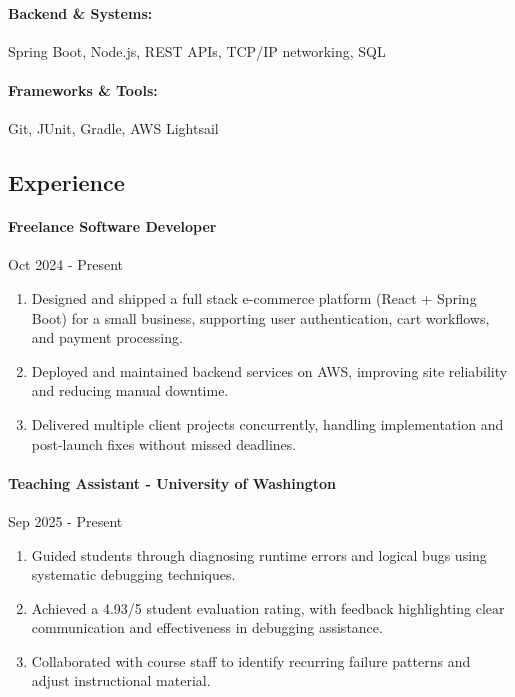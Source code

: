 \documentclass{article}
\begin{document}
\paragraph{Backend \& Systems:} Spring Boot, Node.js, REST APIs, TCP/IP networking, SQL
\vspace{-0.75em}
\paragraph{Frameworks \& Tools:} Git, JUnit, Gradle, AWS Lightsail
\vspace{-0.75em}

\subsection*{Experience}\vspace{-0.75em}\hrulefill\vspace{-1em}

\paragraph{Freelance Software Developer} \hfill Oct 2024 - Present
\begin{enumerate}[label=$\bullet$]
    \item Designed and shipped a full stack e-commerce platform (React + Spring Boot) for a small business, supporting user authentication, cart workflows, and payment processing.
    \item Deployed and maintained backend services on AWS, improving site reliability and reducing manual downtime.
    \item Delivered multiple client projects concurrently, handling implementation and post-launch fixes without missed deadlines.
\end{enumerate}\vspace{-1em}

\paragraph{Teaching Assistant - University of Washington}\hfill Sep 2025 - Present
\begin{enumerate}[label=$\bullet$]
    \item Guided students through diagnosing runtime errors and logical bugs using systematic debugging techniques.
    \item Achieved a 4.93/5 student evaluation rating, with feedback highlighting clear communication and effectiveness in debugging assistance.
    \item Collaborated with course staff to identify recurring failure patterns and adjust instructional material.
\end{enumerate}\vspace{-1em}
\end{document}
